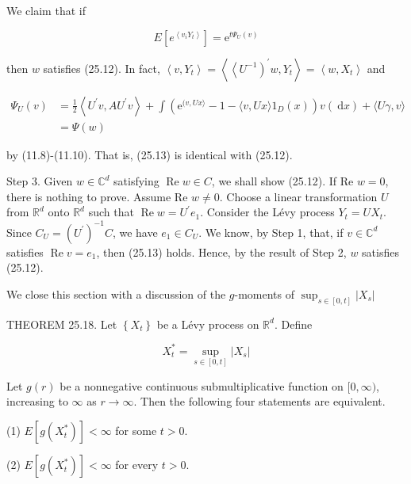 \documentclass[a4paper,12pt]{article}
\begin{document}
We claim that if


\begin{equation*}
    E\left[e^{\left\langle v_{i} Y_{t}\right\rangle}\right]=\mathrm{e}^{t \Psi_{U}(v)} \tag{25.13}
\end{equation*}


then $w$ satisfies (25.12). In fact, $\left\langle v, Y_{t}\right\rangle=\left\langle\left\langle U^{-1}\right)^{\prime} w, Y_{t}\right\rangle=\left\langle w, X_{t}\right\rangle$ and

$$
    \begin{aligned}
        \Psi_{U}(v) & =\frac{1}{2}\left\langle U^{\prime} v, A U^{\prime} v\right\rangle+\int\left(\mathrm{e}^{(v, U x\rangle}-1-\langle v, U x\rangle 1_{D}(x)\right) v(\mathrm{~d} x)+\langle U \gamma, v\rangle \\
                    & =\Psi(w)
    \end{aligned}
$$

by (11.8)-(11.10). That is, (25.13) is identical with (25.12).

Step 3. Given $w \in \mathbb{C}^{d}$ satisfying $\operatorname{Re} w \in C$, we shall show (25.12). If Re $w=0$, there is nothing to prove. Assume Re $w \neq 0$. Choose a linear transformation $U$ from $\mathbb{R}^{d}$ onto $\mathbb{R}^{d}$ such that $\operatorname{Re} w=U^{\prime} e_{1}$. Consider the Lévy process $Y_{t}=U X_{t}$. Since $C_{U}=\left(U^{\prime}\right)^{-1} C$, we have $e_{1} \in C_{U}$. We know, by Step 1, that, if $v \in \mathbb{C}^{d}$ satisfies $\operatorname{Re} v=e_{1}$, then (25.13) holds. Hence, by the result of Step 2, $w$ satisfies (25.12).

We close this section with a discussion of the $g$-moments of $\sup _{s \in[0, t]}\left|X_{s}\right|$

THEOREM 25.18. Let $\left\{X_{t}\right\}$ be a Lévy process on $\mathbb{R}^{d}$. Define


\begin{equation*}
    X_{t}^{*}=\sup _{s \in[0, t]}\left|X_{s}\right| \tag{25.14}
\end{equation*}


Let $g(r)$ be a nonnegative continuous submultiplicative function on $[0, \infty)$, increasing to $\infty$ as $r \rightarrow \infty$. Then the following four statements are equivalent.

(1) $E\left[g\left(X_{t}^{*}\right)\right]<\infty$ for some $t>0$.

(2) $E\left[g\left(X_{t}^{*}\right)\right]<\infty$ for every $t>0$.
\end{document}
